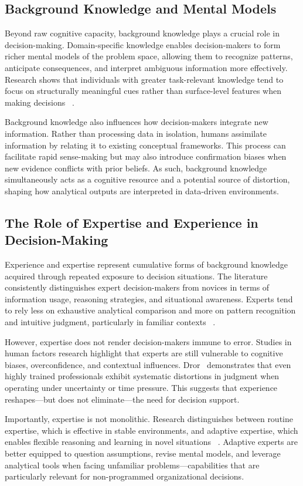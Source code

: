\documentclass{sfuthesis}
\begin{document}
\subsection{Background Knowledge and Mental Models}
Beyond raw cognitive capacity, background knowledge plays a crucial role in decision-making. Domain-specific knowledge enables decision-makers to form richer mental models of the problem space, allowing them to recognize patterns, anticipate consequences, and interpret ambiguous information more effectively. Research shows that individuals with greater task-relevant knowledge tend to focus on structurally meaningful cues rather than surface-level features when making decisions ~\cite{eberhard_effects_2023}.\par
Background knowledge also influences how decision-makers integrate new information. Rather than processing data in isolation, humans assimilate information by relating it to existing conceptual frameworks. This process can facilitate rapid sense-making but may also introduce confirmation biases when new evidence conflicts with prior beliefs. As such, background knowledge simultaneously acts as a cognitive resource and a potential source of distortion, shaping how analytical outputs are interpreted in data-driven environments.
\subsection{The Role of Expertise and Experience in Decision-Making}
Experience and expertise represent cumulative forms of background knowledge acquired through repeated exposure to decision situations. The literature consistently distinguishes expert decision-makers from novices in terms of information usage, reasoning strategies, and situational awareness. Experts tend to rely less on exhaustive analytical comparison and more on pattern recognition and intuitive judgment, particularly in familiar contexts ~\cite{klein1997developing, hutton_expert_1999}.\par
However, expertise does not render decision-makers immune to error. Studies in human factors research highlight that experts are still vulnerable to cognitive biases, overconfidence, and contextual influences. Dror~\cite{dror_cognitive_2020} demonstrates that even highly trained professionals exhibit systematic distortions in judgment when operating under uncertainty or time pressure. This suggests that experience reshapes—but does not eliminate—the need for decision support.\par
Importantly, expertise is not monolithic. Research distinguishes between routine expertise, which is effective in stable environments, and adaptive expertise, which enables flexible reasoning and learning in novel situations ~\cite{croskerry_adaptive_2018}. Adaptive experts are better equipped to question assumptions, revise mental models, and leverage analytical tools when facing unfamiliar problems—capabilities that are particularly relevant for non-programmed organizational decisions.
\end{document}
